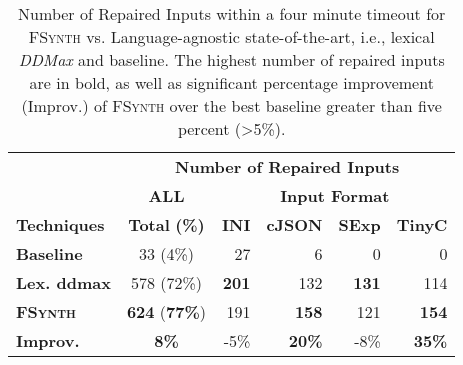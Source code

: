 \documentclass[sigconf,review,anonymous]{acmart}
\newcommand{\approach}{\textsc{FSynth}\xspace}
\newcommand{\ddmax}{\textit{DDMax}\xspace}
\begin{document}
\begin{table}[!tbp]\centering
\caption{Number of Repaired Inputs within a four minute timeout for \approach vs. Language-agnostic state-of-the-art, i.e., lexical \ddmax and  baseline. The highest number of repaired inputs are in bold, as well as significant percentage improvement (Improv.) of \approach over the best baseline greater than five percent (>5\%). }
\begin{tabular}{|l | c | r  r  r  r |}
\hline
&  \multicolumn{5}{c|}{\textbf{Number of Repaired Inputs}}  \\
&  \multicolumn{1}{c|}{\textbf{ALL}} & \multicolumn{4}{c|}{\textbf{Input Format}}  \\
\textbf{Techniques} & \textbf{Total} \textbf{(\%)} & \textbf{INI} & \textbf{cJSON} & \textbf{SExp} & \textbf{TinyC} \\
\hline
\textbf{Baseline}   & 33 (4\%) & 27	 & 6 &	0	& 0\\
\textbf{Lex. ddmax} & 578 (72\%) & \textbf{201}  & 132  & \textbf{131} & 114  \\ 		
\hline	
\textbf{\approach}  & \textbf{624} (\textbf{77\%}) & 191 & \textbf{158}  & 121  & \textbf{154} \\
\hline
\textbf{Improv.} &  \textbf{8\%}  & -5\% & \textbf{20\%} & -8\% & \textbf{35\%} \\
\hline
\end{tabular}
\label{tab:effectiveness-no-grammar}
\end{table}
\end{document}
